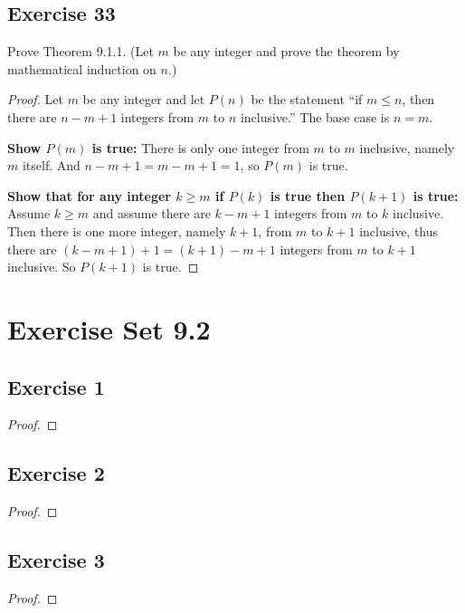 \documentclass[14pt]{extarticle}
\begin{document}
\subsection{Exercise 33}
Prove Theorem 9.1.1. (Let $m$ be any integer and prove the theorem by mathematical induction on $n$.)

\begin{proof}
Let $m$ be any integer and let \(P(n)\) be the statement ``if \(m \leq n\), then there are \(n - m + 1\) integers 
from $m$ to $n$ inclusive.'' The base case is \(n=m\).

{\bf Show $P(m)$ is true:} There is only one integer from $m$ to $m$ inclusive, namely $m$ itself. And \(n - m + 1
 = m - m + 1 = 1\), so $P(m)$ is true.

{\bf Show that for any integer \(k \geq m\) if \(P(k)\) is true then \(P(k+1)\) is true:} Assume \(k \geq m\) and
assume there are \(k-m+1\) integers from $m$ to $k$ inclusive. Then there is one more integer, namely \(k+1\),
from $m$ to $k+1$ inclusive, thus there are \((k-m+1)+1 = (k+1)-m+1\) integers from $m$ to $k+1$ inclusive. So 
\(P(k+1)\) is true.
\end{proof}

\section{Exercise Set 9.2}

\subsection{Exercise 1}

\begin{proof}

\end{proof}

\subsection{Exercise 2}

\begin{proof}

\end{proof}

\subsection{Exercise 3}

\begin{proof}

\end{proof}
\end{document}
